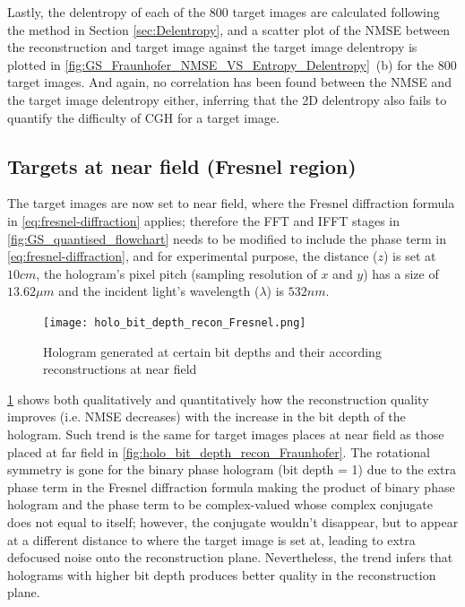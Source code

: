 	Lastly, the delentropy of each of the 800 target images are calculated following the method in Section \ref{sec:Delentropy}, and a scatter plot of the NMSE between the reconstruction and target image against the target image delentropy is plotted in \cref{fig:GS_Fraunhofer_NMSE_VS_Entropy_Delentropy}~(b) for the 800 target images. And again, no correlation has been found between the NMSE and the target image delentropy either, inferring that the 2D delentropy also fails to quantify the difficulty of CGH for a target image.


\subsection{Targets at near field (Fresnel region)}
	The target images are now set to near field, where the Fresnel diffraction formula in \cref{eq:fresnel-diffraction} applies; therefore the FFT and IFFT stages in \cref{fig:GS_quantised_flowchart} needs to be modified to include the phase term in \cref{eq:fresnel-diffraction}, and for experimental purpose, the distance ($z$) is set at $10cm$, the hologram's pixel pitch (sampling resolution of $x$ and $y$) has a size of $13.62\mu m$ and the incident light's wavelength ($\lambda$) is $532nm$.
	\begin{figure} [H]
	   \begin{center}
	   \texttt{[image: holo\_bit\_depth\_recon\_Fresnel.png]}
	   \end{center}
	   \caption{\label{fig:holo_bit_depth_recon_Fresnel} Hologram generated at certain bit depths and their according reconstructions at near field}
	\end{figure}

	\cref{fig:holo_bit_depth_recon_Fresnel} shows both qualitatively and quantitatively how the reconstruction quality improves (i.e. NMSE decreases) with the increase in the bit depth of the hologram. Such trend is the same for target images places at near field as those placed at far field in \cref{fig:holo_bit_depth_recon_Fraunhofer}. The rotational symmetry is gone for the binary phase hologram (bit depth = 1) due to the extra phase term in the Fresnel diffraction formula making the product of binary phase hologram and the phase term to be complex-valued whose complex conjugate does not equal to itself; however, the conjugate wouldn't disappear, but to appear at a different distance to where the target image is set at, leading to extra defocused noise onto the reconstruction plane. Nevertheless, the trend infers that holograms with higher bit depth produces better quality in the reconstruction plane.

